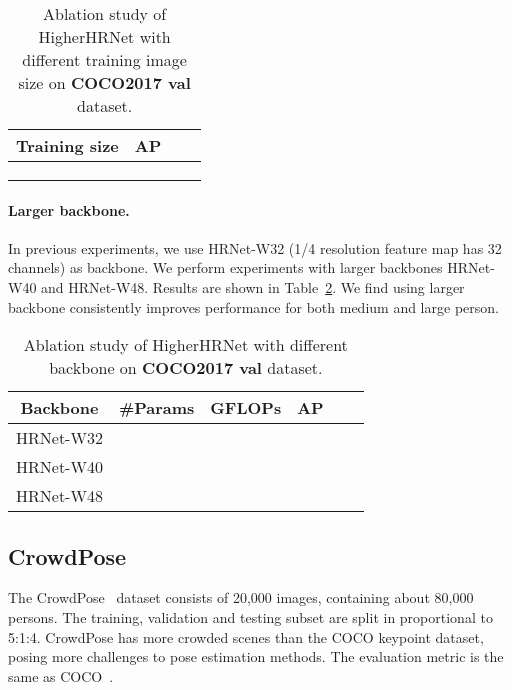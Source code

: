 \documentclass[10pt,twocolumn,letterpaper]{article}
\begin{document}
\begin{table}[bpt]
    \centering
    \setlength{\tabcolsep}{2.0pt}
    \begin{tabular}{c|ccc}
    Training size& AP &&\\
    \hline
    &&&\\ 
    &&&\\ 
    &&&\\ 
    \end{tabular}\vspace{2mm}
    \caption{Ablation study of HigherHRNet with different training image size on \textbf{COCO2017 val} dataset.}
    \label{tab:ablation_training_size}
\end{table}

\vspace{-4mm}
\paragraph{Larger backbone.}
In previous experiments, we use HRNet-W32 (1/4 resolution feature map has 32 channels) as backbone. We perform experiments with larger backbones HRNet-W40 and HRNet-W48. Results are shown in Table~\ref{tab:ablation_backbone}. We find using larger backbone consistently improves performance for both medium and large person.

\begin{table}[bpt]
    \centering
    \setlength{\tabcolsep}{2.0pt}
    \begin{tabular}{c|c|c|ccc}
    Backbone& \#Params & GFLOPs &AP& &\\
    \hline
    HRNet-W32&&&&&\\ 
    HRNet-W40&&&&&\\ 
    HRNet-W48&&&&&\\ 
    \end{tabular}\vspace{2mm}
    \caption{Ablation study of HigherHRNet with different backbone on \textbf{COCO2017 val} dataset.}
    \label{tab:ablation_backbone}
    \vspace{-2mm}
\end{table}

\subsection{CrowdPose}
The CrowdPose~\cite{li2019crowdpose} dataset consists of 20,000 images, containing about 80,000 persons. The training, validation and testing subset are split in proportional to 5:1:4. CrowdPose has more crowded scenes than the COCO keypoint dataset, posing more challenges to pose estimation methods. The evaluation metric is the same as COCO~\cite{lin2014microsoft}.
\end{document}
